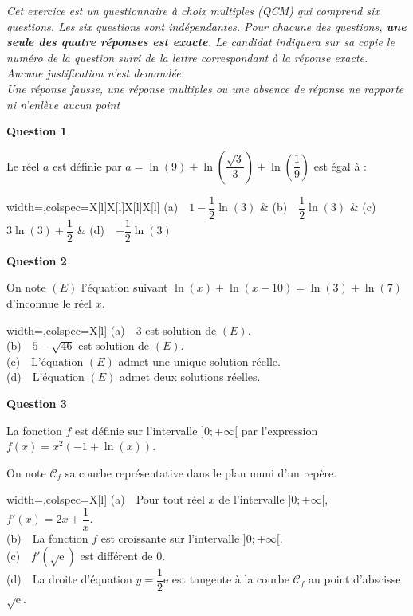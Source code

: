 \emph{Cet exercice est un questionnaire à choix multiples (QCM) qui comprend six questions. Les six questions sont indépendantes. Pour chacune des questions, \textbf{une seule des quatre réponses est exacte}. Le candidat indiquera sur sa copie le numéro de la question suivi de la lettre correspondant à la réponse exacte. \\
	Aucune justification n'est demandée.\\
	Une réponse fausse, une réponse multiples ou une absence de réponse ne rapporte ni n'enlève aucun point}

\medskip

\textbf{Question 1}

\medskip

Le réel $a$ est définie par $a = \ln (9) + \ln \left(\dfrac{\sqrt{3}}{3} \right)  + \ln \left(\dfrac19 \right)$ est égal à :

\begin{tblr}{width=\linewidth,colspec={X[l]X[l]X[l]X[l]}}
	(a)~~$1 - \dfrac12 \ln (3)$ & (b)~~$\dfrac12 \ln (3)$ & (c)~~$3 \ln (3) + \dfrac12$ & (d)~~$- \dfrac12 \ln (3)$
\end{tblr}

\bigskip

\textbf{Question 2}

\medskip

On note $(E)$ l'équation suivant $\ln (x) + \ln (x - 10) = \ln (3) + \ln (7)$ d'inconnue le réel $x$.

\medskip

\begin{tblr}{width=\linewidth,colspec={X[l]}}
	(a)~~3 est solution de $(E)$. \\
	(b)~~$5 - \sqrt{46}$ est solution de $(E)$.\\
	(c)~~L'équation $(E)$ admet une unique solution réelle.\\
	(d)~~L'équation $(E)$ admet deux solutions réelles.
\end{tblr}

\bigskip

\textbf{Question 3}

\medskip

La fonction $f$ est définie sur l'intervalle $]0;+\infty[$ par l'expression $f(x) = x^2(- 1 + \ln (x))$.

On note $\mathcal{C}_f$ sa courbe représentative dans le plan muni d'un repère.

\medskip

\begin{tblr}{width=\linewidth,colspec={X[l]}}
	(a)~~Pour tout réel $x$ de l'intervalle $]0;+\infty[$, $f'(x) = 2x + \dfrac1x$. \\
	(b)~~La fonction $f$ est croissante sur l'intervalle $]0;+\infty[$.\\
	(c)~~$f'\left(\sqrt{\text{e}} \right)$ est différent de $0$.\\
	(d)~~La droite d'équation $y = \dfrac12 \text{e}$ est tangente à la courbe $\mathcal{C}_f$ au point d'abscisse $\sqrt{\text{e}}$.
\end{tblr}

